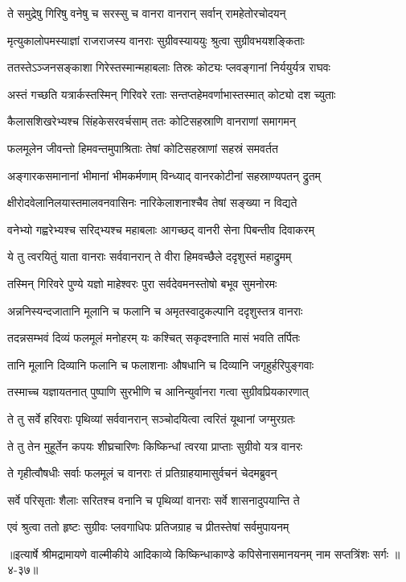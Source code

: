 \twolineshloka
{ते समुद्रेषु गिरिषु वनेषु च सरस्सु च}
{वानरा वानरान् सर्वान् रामहेतोरचोदयन्} %

\twolineshloka
{मृत्युकालोपमस्याज्ञां राजराजस्य वानराः}
{सुग्रीवस्याययुः श्रुत्वा सुग्रीवभयशङ्किताः} %

\twolineshloka
{ततस्तेऽञ्जनसङ्काशा गिरेस्तस्मान्महाबलाः}
{तिस्रः कोट्यः प्लवङ्गानां निर्ययुर्यत्र राघवः} %

\twolineshloka
{अस्तं गच्छति यत्रार्कस्तस्मिन् गिरिवरे रताः}
{सन्तप्तहेमवर्णाभास्तस्मात् कोट्यो दश च्युताः} %

\twolineshloka
{कैलासशिखरेभ्यश्च सिंहकेसरवर्चसाम्}
{ततः कोटिसहस्राणि वानराणां समागमन्} %

\twolineshloka
{फलमूलेन जीवन्तो हिमवन्तमुपाश्रिताः}
{तेषां कोटिसहस्राणां सहस्रं समवर्तत} %

\twolineshloka
{अङ्गारकसमानानां भीमानां भीमकर्मणाम्}
{विन्ध्याद् वानरकोटीनां सहस्राण्यपतन् द्रुतम्} %

\twolineshloka
{क्षीरोदवेलानिलयास्तमालवनवासिनः}
{नारिकेलाशनाश्चैव तेषां सङ्ख्या न विद्यते} %

\twolineshloka
{वनेभ्यो गह्वरेभ्यश्च सरिद्भ्यश्च महाबलाः}
{आगच्छद् वानरी सेना पिबन्तीव दिवाकरम्} %

\twolineshloka
{ये तु त्वरयितुं याता वानराः सर्ववानरान्}
{ते वीरा हिमवच्छैले ददृशुस्तं महाद्रुमम्} %

\twolineshloka
{तस्मिन् गिरिवरे पुण्ये यज्ञो माहेश्वरः पुरा}
{सर्वदेवमनस्तोषो बभूव सुमनोरमः} %

\twolineshloka
{अन्ननिस्यन्दजातानि मूलानि च फलानि च}
{अमृतस्वादुकल्पानि ददृशुस्तत्र वानराः} %

\twolineshloka
{तदन्नसम्भवं दिव्यं फलमूलं मनोहरम्}
{यः कश्चित् सकृदश्नाति मासं भवति तर्पितः} %

\twolineshloka
{तानि मूलानि दिव्यानि फलानि च फलाशनाः}
{औषधानि च दिव्यानि जगृहुर्हरिपुङ्गवाः} %

\twolineshloka
{तस्माच्च यज्ञायतनात् पुष्पाणि सुरभीणि च}
{आनिन्युर्वानरा गत्वा सुग्रीवप्रियकारणात्} %

\twolineshloka
{ते तु सर्वे हरिवराः पृथिव्यां सर्ववानरान्}
{सञ्चोदयित्वा त्वरितं यूथानां जग्मुरग्रतः} %

\twolineshloka
{ते तु तेन मुहूर्तेन कपयः शीघ्रचारिणः}
{किष्किन्धां त्वरया प्राप्ताः सुग्रीवो यत्र वानरः} %

\twolineshloka
{ते गृहीत्वौषधीः सर्वाः फलमूलं च वानराः}
{तं प्रतिग्राहयामासुर्वचनं चेदमब्रुवन्} %

\twolineshloka
{सर्वे परिसृताः शैलाः सरितश्च वनानि च}
{पृथिव्यां वानराः सर्वे शासनादुपयान्ति ते} %

\twolineshloka
{एवं श्रुत्वा ततो हृष्टः सुग्रीवः प्लवगाधिपः}
{प्रतिजग्राह च प्रीतस्तेषां सर्वमुपायनम्} %


॥इत्यार्षे श्रीमद्रामायणे वाल्मीकीये आदिकाव्ये किष्किन्धाकाण्डे कपिसेनासमानयनम् नाम सप्तत्रिंशः सर्गः ॥४-३७॥
